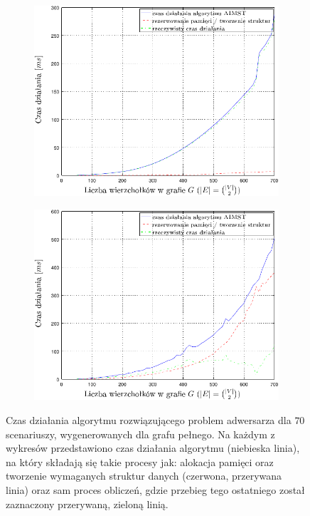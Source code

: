 \begin{figure}[!htbp]
	\ContinuedFloat
	\null\hfill
	\begin{subfigure}[b]{0.45\textwidth}
		\includegraphics[width=\textwidth]{Chapter_VI/AIMST1-example/AIMST1_psfrag}
		\caption{}
		\label{fig:aimst1:a}
	\end{subfigure}
	\hfill
	\begin{subfigure}[b]{0.45\textwidth}
		\includegraphics[width=\textwidth]{Chapter_VI/AIMST2-example/AIMST2_psfrag}
		\caption{}
		\label{fig:aimst1:b}
	\end{subfigure}
	\hfill\null
	\caption{
		Czas działania algorytmu rozwiązującego problem adwersarza dla $70$ scenariuszy, wygenerowanych dla grafu pełnego. Na każdym z wykresów przedstawiono czas działania algorytmu (niebieska linia), na który składają się takie procesy jak: alokacja pamięci oraz tworzenie wymaganych struktur danych (czerwona, przerywana linia) oraz sam proces obliczeń, gdzie przebieg tego ostatniego został zaznaczony przerywaną, zieloną linią.
}
\end{figure}
